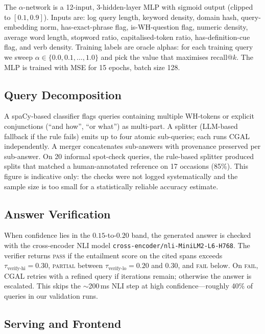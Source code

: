 \documentclass[11pt,a4paper,twocolumn]{article}
\begin{document}
The $\alpha$-network is a 12-input, 3-hidden-layer MLP with sigmoid
output (clipped to $[0.1, 0.9]$). Inputs are: log query length,
keyword density, domain hash, query-embedding norm, has-exact-phrase
flag, is-WH-question flag, numeric density, average word length,
stopword ratio, capitalised-token ratio, has-definition-cue flag, and
verb density. Training
labels are oracle alphas: for each training query we sweep
$\alpha \in \{0.0, 0.1, \dots, 1.0\}$ and pick the value that maximises
recall@$k$. The MLP is trained with MSE for 15 epochs, batch size 128.

\subsection{Query Decomposition}\label{sec:decomp}

A spaCy-based classifier flags queries containing multiple WH-tokens or
explicit conjunctions (``and how'', ``or what'') as multi-part. A
splitter (LLM-based fallback if the rule fails) emits up to four atomic
sub-queries; each runs CGAL independently. A merger concatenates
sub-answers with provenance preserved per sub-answer. On 20 informal
spot-check queries, the rule-based splitter produced splits that matched
a human-annotated reference on 17 occasions (85\%). This figure is
indicative only: the checks were not logged systematically and the
sample size is too small for a statistically reliable accuracy
estimate.

\subsection{Answer Verification}\label{sec:verify}

When confidence lies in the $0.15$-to-$0.20$ band, the generated answer is
checked with the cross-encoder NLI model
\texttt{cross-encoder/nli-MiniLM2-L6-H768}.
The verifier returns \textsc{pass} if the entailment score on the cited
spans exceeds $\tau_{\text{verify-hi}}{=}0.30$, \textsc{partial} between
$\tau_{\text{verify-lo}}{=}0.20$ and $0.30$, and
\textsc{fail} below. On \textsc{fail}, CGAL retries with a refined query
if iterations remain; otherwise the answer is escalated. This skips the
$\sim$200\,ms NLI step at high confidence---roughly 40\% of queries in
our validation runs.
\subsection{Serving and Frontend}\label{sec:serving}
\end{document}
